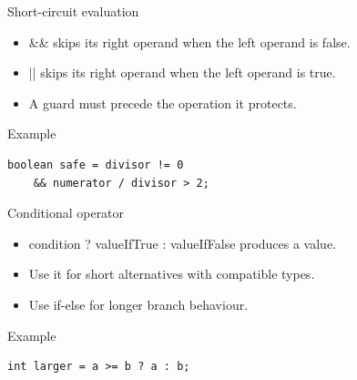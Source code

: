 \documentclass[10pt,aspectratio=169]{beamer}
\begin{document}
\begin{frame}[fragile,t]{Short-circuit evaluation}
\begin{itemize}
\item \&\& skips its right operand when the left operand is false.
\item || skips its right operand when the left operand is true.
\item A guard must precede the operation it protects.
\end{itemize}
\vspace{1mm}\begin{block}{Example}
\begin{lstlisting}
boolean safe = divisor != 0
    && numerator / divisor > 2;
\end{lstlisting}
\end{block}
\end{frame}

\begin{frame}[fragile,t]{Conditional operator}
\begin{itemize}
\item condition ? valueIfTrue : valueIfFalse produces a value.
\item Use it for short alternatives with compatible types.
\item Use if-else for longer branch behaviour.
\end{itemize}
\vspace{1mm}\begin{block}{Example}
\begin{lstlisting}
int larger = a >= b ? a : b;
\end{lstlisting}
\end{block}
\end{frame}
\end{document}
